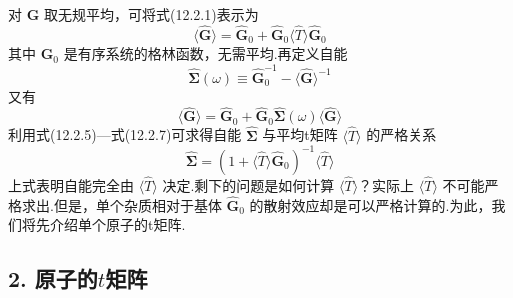 对 $\hat{\boldsymbol{G}}$ 取无规平均，可将式(12.2.1)表示为
\begin{equation}
  \langle\hat{\boldsymbol{G}}\rangle=\hat{\boldsymbol{G}}_{0}
  +\hat{\boldsymbol{G}}_{0}\langle\hat{T}\rangle\hat{\boldsymbol{G}}_{0}
\end{equation}
其中 $\hat{\boldsymbol{G}}_{0}$ 是有序系统的格林函数，无需平均.再定义自能
\begin{equation}
  \hat{\boldsymbol{\Sigma}}\left(\omega\right)\equiv
  \hat{\boldsymbol{G}}_{0}^{-1}-\langle\hat{\boldsymbol{G}}\rangle^{-1}
\end{equation}
又有
\begin{equation}
  \langle\hat{\boldsymbol{G}}\rangle=\hat{\boldsymbol{G}}_{0}
  +\hat{\boldsymbol{G}}_{0}\hat{\boldsymbol{\Sigma}}\left(\omega\right)\langle\hat{\boldsymbol{G}}\rangle
\end{equation}
利用式(12.2.5)—式(12.2.7)可求得自能 $\hat{\boldsymbol{\Sigma}}$ 与平均t矩阵 $\langle\hat{T}\rangle$ 的严格关系
\begin{equation}
  \hat{\boldsymbol{\Sigma}}=\left(1+\langle\hat{T}\rangle\hat{\boldsymbol{G}}_{0}\right)^{-1}\langle\hat{T}\rangle
\end{equation}
上式表明自能完全由 $\langle\hat{T}\rangle$ 决定.剩下的问题是如何计算 $\langle\hat{T}\rangle$？实际上 $\langle\hat{T}\rangle$ 不可能严格求出.但是，单个杂质相对于基体 $\hat{\boldsymbol{G}}_{0}$ 的散射效应却是可以严格计算的.为此，我们将先介绍单个原子的t矩阵.

\subsection*{2. 原子的$ t $矩阵}

